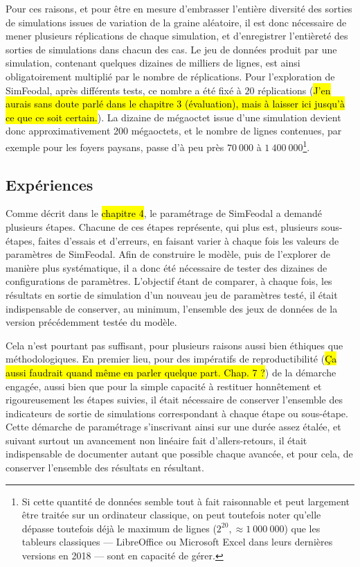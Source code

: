 	Pour ces raisons, et pour être en mesure d'embrasser l'entière diversité des sorties de simulations issues de variation de la graine aléatoire, il est donc nécessaire de mener plusieurs réplications de chaque simulation, et d'enregistrer l'entièreté des sorties de simulations dans chacun des cas.
	Le jeu de données produit par une simulation, contenant quelques dizaines de milliers de lignes, est ainsi obligatoirement multiplié par le nombre de réplications.
	Pour l'exploration de SimFeodal, après différents tests, ce nombre a été fixé à $20$ réplications (\hl{J'en aurais sans doute parlé dans le chapitre 3 (évaluation), mais à laisser ici jusqu'à ce que ce soit certain.}).
	La dizaine de mégaoctet issue d'une simulation devient donc approximativement 200 mégaoctets, et le nombre de lignes contenues, par exemple pour les foyers paysans, passe d'à peu près $70~000$ à $1~400~000$\footnote{
	Si cette quantité de données semble tout à fait raisonnable et peut largement être traitée sur un ordinateur classique, on peut toutefois noter qu'elle dépasse toutefois déjà le maximum de lignes ($2^{20}, \approx 1~000~000$) que les tableurs classiques ---
	LibreOffice ou Microsoft Excel dans leurs dernières versions en 2018
	--- sont en capacité de gérer.
	}.

	\subsection{Expériences}

	Comme décrit dans le \hl{chapitre 4}, le paramétrage de SimFeodal a demandé plusieurs étapes.
	Chacune de ces étapes représente, qui plus est, plusieurs sous-étapes, faites d'essais et d'erreurs, en faisant varier à chaque fois les valeurs de paramètres de SimFeodal.
	Afin de construire le modèle, puis de l'explorer de manière plus systématique, il a donc été nécessaire de tester des dizaines de configurations de paramètres.
	L'objectif étant de comparer, à chaque fois, les résultats en sortie de simulation d'un nouveau jeu de paramètres testé, il était indispensable de conserver, au minimum, l'ensemble des jeux de données de la version précédemment testée du modèle.
	
	Cela n'est pourtant pas suffisant, pour plusieurs raisons aussi bien éthiques que méthodologiques.
	En premier lieu, pour des impératifs de reproductibilité (\hl{Ça aussi faudrait quand même en parler quelque part. Chap. 7 ?}) de la démarche engagée, aussi bien que pour la simple capacité à restituer honnêtement et rigoureusement les étapes suivies, il était nécessaire de conserver l'ensemble des indicateurs de sortie de simulations correspondant à chaque étape ou sous-étape.
	Cette démarche de paramétrage s'inscrivant ainsi sur une durée assez étalée, et suivant surtout un avancement non linéaire fait d'allers-retours, il était indispensable de documenter autant que possible chaque avancée, et pour cela, de conserver l'ensemble des résultats en résultant.

